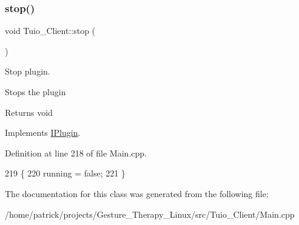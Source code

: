 \subsubsection{\texorpdfstring{stop()}{stop()}}
{\footnotesize\ttfamily void Tuio\+\_\+\+Client\+::stop (\begin{DoxyParamCaption}{ }\end{DoxyParamCaption})\hspace{0.3cm}{\ttfamily [virtual]}}



Stop plugin. 

Stops the plugin \begin{DoxyReturn}{Returns}
void 
\end{DoxyReturn}


Implements \hyperlink{class_i_plugin_a86e523c283aec5c9fb21249a76e916ac}{I\+Plugin}.



Definition at line 218 of file Main.\+cpp.


\begin{DoxyCode}
219 \{
220     running = \textcolor{keyword}{false};
221 \}
\end{DoxyCode}


The documentation for this class was generated from the following file\+:\begin{DoxyCompactItemize}
\item 
/home/patrick/projects/\+Gesture\+\_\+\+Therapy\+\_\+\+Linux/src/\+Tuio\+\_\+\+Client/Main.\+cpp\end{DoxyCompactItemize}
